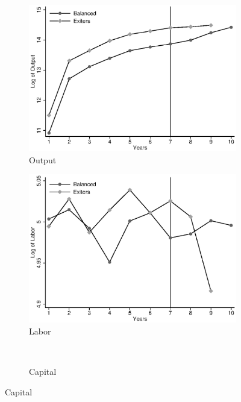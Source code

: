 \documentclass[11pt]{article}
\begin{document}
\begin{figure}[ht]
	\caption{Time series by samples}\label{fig:time}
	\centering	
	\begin{subfigure}[b]{.3\textwidth}
		\centering
		\caption{Output}
		\includegraphics[width=\textwidth]{./timeY.eps}
	\end{subfigure}
	\begin{subfigure}[b]{.3\textwidth}
		\centering
		\caption{Labor}
		\includegraphics[width=\textwidth]{./timeL.eps}
	\end{subfigure}\\
	\begin{subfigure}[b]{.3\textwidth}
		\centering
		\caption{Capital}

\end{subfigure}
\end{figure}
\end{document}
